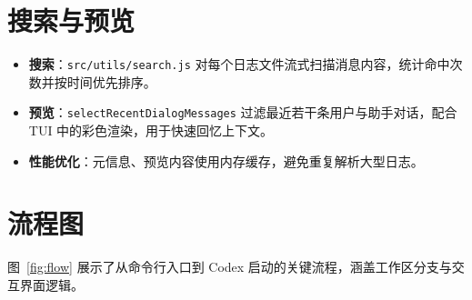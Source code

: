 \documentclass[12pt]{article}
\begin{document}
\section{搜索与预览}
\begin{itemize}[leftmargin=2em]
  \item \textbf{搜索}：\texttt{src/utils/search.js} 对每个日志文件流式扫描消息内容，统计命中次数并按时间优先排序。
  \item \textbf{预览}：\texttt{selectRecentDialogMessages} 过滤最近若干条用户与助手对话，配合 TUI 中的彩色渲染，用于快速回忆上下文。
  \item \textbf{性能优化}：元信息、预览内容使用内存缓存，避免重复解析大型日志。
\end{itemize}

\section{流程图}
图~\ref{fig:flow} 展示了从命令行入口到 Codex 启动的关键流程，涵盖工作区分支与交互界面逻辑。
\end{document}
